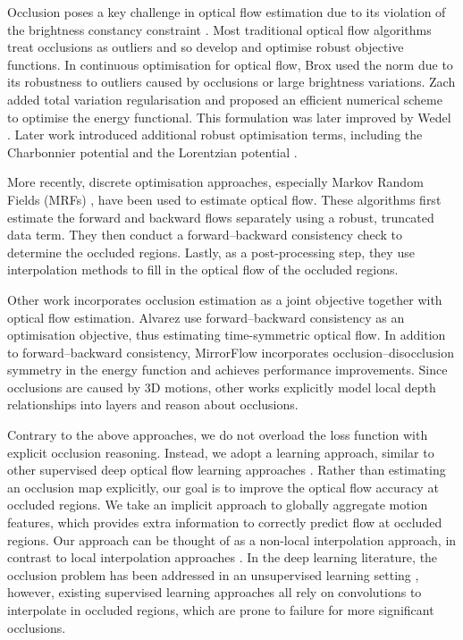 \documentclass[10pt,twocolumn,letterpaper]{article}
\begin{document}
Occlusion poses a key challenge in optical flow estimation due to its violation of the brightness
constancy constraint \cite{horn}. Most traditional optical flow algorithms treat occlusions as outliers
and so develop and optimise robust objective functions. In continuous optimisation for optical flow, 
Brox \etal \cite{broxl1} used the  norm due to its robustness to outliers caused by occlusions
or large brightness variations. Zach \etal \cite{tvl1} added total variation regularisation
and proposed an efficient numerical scheme to optimise the energy functional. 
This formulation was later improved by Wedel \etal \cite{wedel2009improved}. Later work introduced
additional robust optimisation terms, including the Charbonnier potential \cite{LKmeetsHS} and the Lorentzian
potential \cite{lorentzian}.

More recently, discrete optimisation approaches, especially Markov Random Fields (MRFs) \cite{boykov},
have been used to estimate optical flow. These algorithms \cite{discreteflow, fullflow, dcflow} first estimate
the forward and backward flows separately using a robust, truncated data term. They then conduct a 
forward--backward consistency check to determine the occluded regions. Lastly, as a post-processing step,
they use interpolation methods \cite{epicflow} to fill in the optical flow of the occluded regions.

Other work incorporates occlusion estimation as a joint objective together with optical flow
estimation. Alvarez \etal \cite{alvarez} use
forward--backward consistency as an optimisation objective, thus estimating time-symmetric
optical flow. In addition to forward--backward consistency, MirrorFlow \cite{mirrorflow} 
incorporates occlusion--disocclusion symmetry in the energy function and achieves
performance improvements. Since occlusions are caused by 3D motions, other works
\cite{sun2010layered, sun2014local} explicitly model 
local depth relationships into layers and reason about occlusions. 

Contrary to the above approaches, we do not overload the loss function with explicit occlusion reasoning.
Instead, we adopt a learning approach, similar to other supervised deep optical flow learning
approaches \cite{pwcnet,hd3,liteflownet,devon,irr,vcn,scopeflow,maskflownet,dicl,raft}. Rather than estimating
an occlusion map explicitly, our goal is to improve the optical flow accuracy at occluded regions. 
We take an implicit approach to globally aggregate motion features, which provides extra information
to correctly predict flow at occluded regions. Our approach can be thought of as a non-local interpolation
approach, in contrast to local interpolation approaches \cite{epicflow}. 
In the deep learning literature, the occlusion problem
has been addressed in an unsupervised learning setting \cite{occaware,multiframe,selflow}, 
however, existing supervised learning approaches all rely on convolutions
to interpolate in occluded regions, which are prone to failure for
more significant occlusions. 
\end{document}
